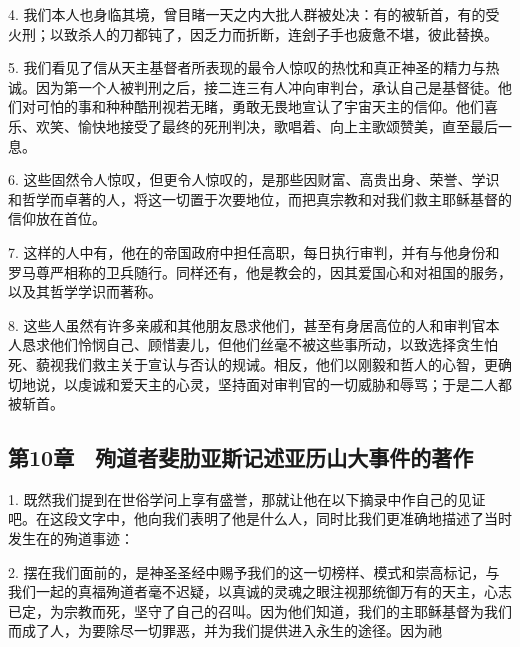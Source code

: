 4. 我们本人也身临其境，曾目睹一天之内大批人群被处决：有的被斩首，有的受火刑；以致杀人的刀都钝了，因乏力而折断，连刽子手也疲惫不堪，彼此替换。\par

5. 我们看见了信从天主基督者所表现的最令人惊叹的热忱和真正神圣的精力与热诚。因为第一个人被判刑之后，接二连三有人冲向审判台，承认自己是基督徒。他们对可怕的事和种种酷刑视若无睹，勇敢无畏地宣认了宇宙天主的信仰。他们喜乐、欢笑、愉快地接受了最终的死刑判决，歌唱着、向上主歌颂赞美，直至最后一息。\par

6. 这些固然令人惊叹，但更令人惊叹的，是那些因财富、高贵出身、荣誉、学识和哲学而卓著的人，将这一切置于次要地位，而把真宗教和对我们救主耶稣基督的信仰放在首位。\par

7. 这样的人中有，他在的帝国政府中担任高职，每日执行审判，并有与他身份和罗马尊严相称的卫兵随行。同样还有，他是教会的，因其爱国心和对祖国的服务，以及其哲学学识而著称。\par

8. 这些人虽然有许多亲戚和其他朋友恳求他们，甚至有身居高位的人和审判官本人恳求他们怜悯自己、顾惜妻儿，但他们丝毫不被这些事所动，以致选择贪生怕死、藐视我们救主关于宣认与否认的规诫。相反，他们以刚毅和哲人的心智，更确切地说，以虔诚和爱天主的心灵，坚持面对审判官的一切威胁和辱骂；于是二人都被斩首。\par


\subsection{第10章　殉道者斐肋亚斯记述亚历山大事件的著作}

1. 既然我们提到在世俗学问上享有盛誉，那就让他在以下摘录中作自己的见证吧。在这段文字中，他向我们表明了他是什么人，同时比我们更准确地描述了当时发生在的殉道事迹：\par

2. 摆在我们面前的，是神圣圣经中赐予我们的这一切榜样、模式和崇高标记，与我们一起的真福殉道者毫不迟疑，以真诚的灵魂之眼注视那统御万有的天主，心志已定，为宗教而死，坚守了自己的召叫。因为他们知道，我们的主耶稣基督为我们而成了人，为要除尽一切罪恶，并为我们提供进入永生的途径。因为祂\par


